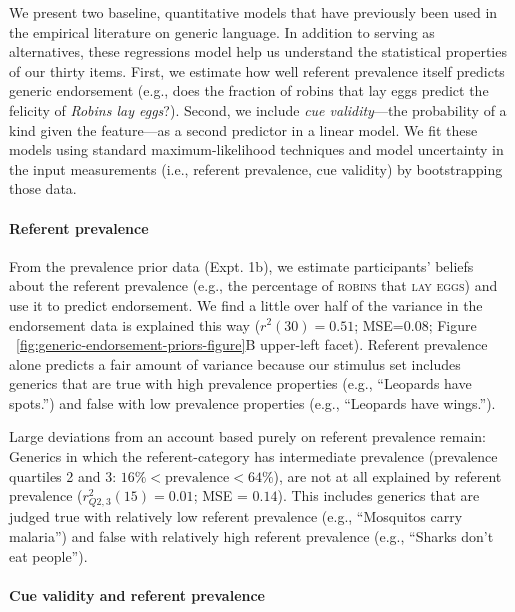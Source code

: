 \documentclass[english,,man,floatsintext]{apa6}
\let\oldparagraph\paragraph
\renewcommand{\paragraph}[1]{\oldparagraph{#1}\mbox{}}
\theoremstyle{definition}
\theoremstyle{definition}
\theoremstyle{definition}
\theoremstyle{remark}
\begin{document}
We present two baseline, quantitative models that have previously been
used in the empirical literature on generic language. In addition to
serving as alternatives, these regressions model help us understand the
statistical properties of our thirty items. First, we estimate how well
referent prevalence itself predicts generic endorsement (e.g., does the
fraction of robins that lay eggs predict the felicity of \emph{Robins
lay eggs}?). Second, we include \emph{cue validity}---the probability of
a kind given the feature---as a second predictor in a linear model. We
fit these models using standard maximum-likelihood techniques and model
uncertainty in the input measurements (i.e., referent prevalence, cue
validity) by bootstrapping those data.

\hypertarget{referent-prevalence}{%
\paragraph{Referent prevalence}\label{referent-prevalence}}

From the prevalence prior data (Expt. 1b), we estimate participants'
beliefs about the referent prevalence (e.g., the percentage of
\textsc{robins} that \textsc{lay eggs}) and use it to predict
endorsement. We find a little over half of the variance in the
endorsement data is explained this way (\(r^2(30) = 0.51\);
MSE=\(0.08\); Figure ~\ref{fig:generic-endorsement-priors-figure}B
upper-left facet). Referent prevalence alone predicts a fair amount of
variance because our stimulus set includes generics that are true with
high prevalence properties (e.g., \enquote{Leopards have spots.}) and
false with low prevalence properties (e.g., \enquote{Leopards have
wings.}).

Large deviations from an account based purely on referent prevalence
remain: Generics in which the referent-category has intermediate
prevalence (prevalence quartiles 2 and 3:
\(16\% < \text{prevalence} < 64\%\)), are not at all explained by
referent prevalence (\(r_{Q2,3}^2(15) = 0.01\); MSE = \(0.14\)). This
includes generics that are judged true with relatively low referent
prevalence (e.g., \enquote{Mosquitos carry malaria}) and false with
relatively high referent prevalence (e.g., \enquote{Sharks don't eat
people}).

\hypertarget{cue-validity-and-referent-prevalence}{%
\paragraph{Cue validity and referent
prevalence}\label{cue-validity-and-referent-prevalence}}
\end{document}
